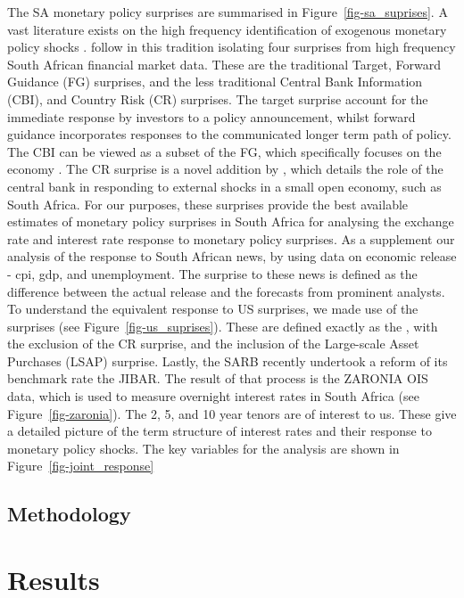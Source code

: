 \documentclass[
  letterpaper,
  DIV=11,
  numbers=noendperiod]{scrartcl}
\begin{document}
The SA monetary policy surprises are summarised in
Figure~\ref{fig-sa_suprises}. A vast literature exists on the high
frequency identification of exogenous monetary policy shocks
\citep[see][]{kuttner2001b, cook1989, gurkaynak2005a, swanson2021a, miranda-agrippino2021}.
\citet{pirozhkova2024a} follow in this tradition isolating four
surprises from high frequency South African financial market data. These
are the traditional Target, Forward Guidance (FG) surprises, and the
less traditional Central Bank Information (CBI), and Country Risk (CR)
surprises. The target surprise account for the immediate response by
investors to a policy announcement, whilst forward guidance incorporates
responses to the communicated longer term path of policy. The CBI can be
viewed as a subset of the FG, which specifically focuses on the economy
\citep{jarocinski2024a}. The CR surprise is a novel addition by
\citet{pirozhkova2024a}, which details the role of the central bank in
responding to external shocks in a small open economy, such as South
Africa. For our purposes, these surprises provide the best available
estimates of monetary policy surprises in South Africa for analysing the
exchange rate and interest rate response to monetary policy surprises.
As a supplement our analysis of the response to South African news, by
using data on economic release - cpi, gdp, and unemployment. The
surprise to these news is defined as the difference between the actual
release and the forecasts from prominent analysts. To understand the
equivalent response to US surprises, we made use of the
\citet{jarocinski2024a} surprises (see Figure~\ref{fig-us_suprises}).
These are defined exactly as the \citet{pirozhkova2024a}, with the
exclusion of the CR surprise, and the inclusion of the Large-scale Asset
Purchases (LSAP) surprise. Lastly, the SARB recently undertook a reform
of its benchmark rate the JIBAR. The result of that process is the
ZARONIA OIS data, which is used to measure overnight interest rates in
South Africa (see Figure~\ref{fig-zaronia}). The 2, 5, and 10 year
tenors are of interest to us. These give a detailed picture of the term
structure of interest rates and their response to monetary policy
shocks. The key variables for the analysis are shown in
Figure~\ref{fig-joint_response}

\subsection{Methodology}\label{methodology}

\section{Results}\label{results}
\end{document}

